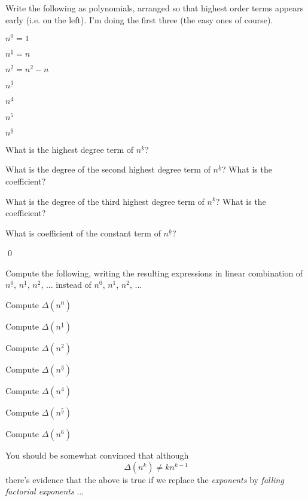 \begin{ex}
  Write the following as polynomials, arranged so that highest order
  terms appears early (i.e. on the left).
  I'm doing the first three (the easy ones of course).
  \begin{tightlist}
    \item $n^{\underline{0}} = 1$
    \item $n^{\underline{1}} = n$
    \item $n^{\underline{2}} = n^2 - n$
    \item $n^{\underline{3}}$
    \item $n^{\underline{4}}$
    \item $n^{\underline{5}}$
    \item $n^{\underline{6}}$
    \item What is the highest degree term of $n^{\underline{k}}$?
    \item What is the degree of the second highest degree term of
    $n^{\underline{k}}$? What is the coefficient?
    \item What is the degree of the third highest degree term of
    $n^{\underline{k}}$? What is the coefficient?
    \item What is coefficient of the constant term of
    $n^{\underline{k}}$?
  \end{tightlist}
  \qed
\end{ex}

\begin{ex}
  Compute the following,
  writing the resulting expressions in
  linear combination of
  $n^{\underline{0}}$,
  $n^{\underline{1}}$,
  $n^{\underline{2}}$, ...
  instead of
  $n^{{0}}$,
  $n^{{1}}$,
  $n^{{2}}$, ...
  \begin{tightlist}
    \item Compute $\Delta (n^{\underline{0}})$
    \item Compute $\Delta (n^{\underline{1}})$
    \item Compute $\Delta (n^{\underline{2}})$
    \item Compute $\Delta (n^{\underline{3}})$
    \item Compute $\Delta (n^{\underline{4}})$
    \item Compute $\Delta (n^{\underline{5}})$
    \item Compute $\Delta (n^{\underline{6}})$
  \end{tightlist}
\end{ex}

You should be somewhat convinced that
although
\[
\Delta (n^k) \neq k n^{k-1}
\]
there's evidence that the above is true if we replace
the \textit{exponents} by \textit{falling factorial exponents} ...


